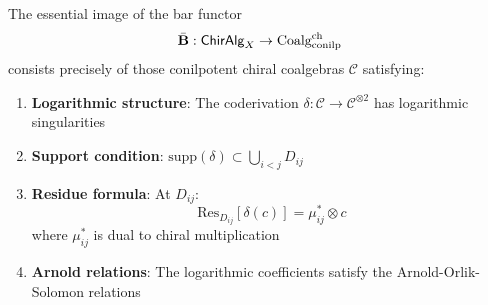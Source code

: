 \begin{theorem}
The essential image of the bar functor 
$$\bar{\mathbf{B}}: \mathsf{ChirAlg}_X \to \text{Coalg}_{\text{conilp}}^{\text{ch}}$$
consists precisely of those conilpotent chiral coalgebras $\mathcal{C}$ satisfying:
\begin{enumerate}
\item \textbf{Logarithmic structure}: The coderivation $\delta: \mathcal{C} \to \mathcal{C}^{\otimes 2}$ has logarithmic singularities
\item \textbf{Support condition}: $\text{supp}(\delta) \subset \bigcup_{i<j} D_{ij}$
\item \textbf{Residue formula}: At $D_{ij}$:
$$\text{Res}_{D_{ij}}[\delta(c)] = \mu_{ij}^* \otimes c$$
where $\mu_{ij}^*$ is dual to chiral multiplication
\item \textbf{Arnold relations}: The logarithmic coefficients satisfy the Arnold-Orlik-Solomon relations
\end{enumerate}
\end{theorem}

